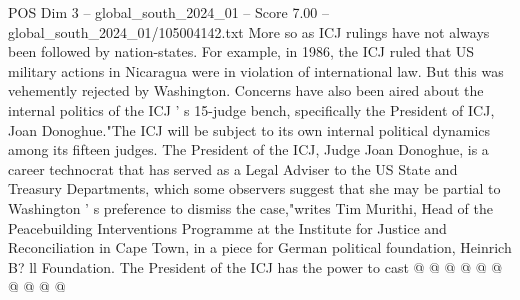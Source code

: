 \begin{textsample}{POS Dim 3 – global\_south\_2024\_01 – Score 7.00 – global\_south\_2024\_01/105004142.txt}
More so as ICJ rulings have not always been followed by nation-states.
For example, in 1986, the ICJ ruled that US military actions in Nicaragua were in violation of international law.
But this was vehemently rejected by Washington.
Concerns have also been aired about the internal politics of the ICJ ' s 15-judge bench, specifically the President of ICJ, Joan Donoghue."The ICJ will be subject to its own internal political dynamics among its fifteen judges.
The President of the ICJ, Judge Joan Donoghue, is a career technocrat that has served as a Legal Adviser to the US State and Treasury Departments, which some observers suggest that she may be partial to Washington ' s preference to dismiss the case,"writes Tim Murithi, Head of the Peacebuilding Interventions Programme at the Institute for Justice and Reconciliation in Cape Town, in a piece for German political foundation, Heinrich B? ll Foundation.
The President of the ICJ has the power to cast @ @ @ @ @ @ @ @ @ @

\end{textsample}
